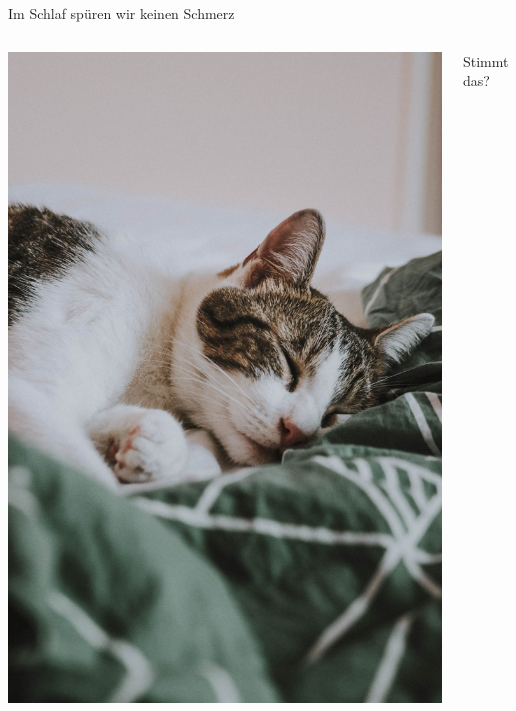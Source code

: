 \documentclass{beamer}
\begin{document}
\begin{frame}{Im Schlaf spüren wir keinen Schmerz}

\begin{columns}[c]

\begin{column}{5cm}
\begin{center}
    \includegraphics[width=\textwidth]{mathias-reding-4_YakZekVv0-unsplash.jpg}
\end{center}
\end{column}

\begin{column}{5cm}

Stimmt das? \\[0.5cm]



\end{column}


\end{columns}

    
\end{frame}
\end{document}
